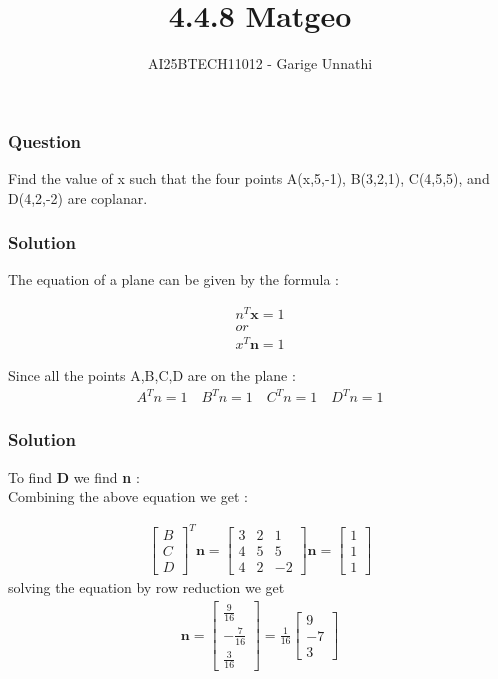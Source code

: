 \documentclass{beamer}
\title{4.4.8 Matgeo}
\author{AI25BTECH11012 - Garige Unnathi}
\date{}
\begin{document}
\frame{\titlepage}

\begin{frame}
\frametitle{Question}
Find the value of x such that the four points A(x,5,-1), B(3,2,1), C(4,5,5), and
D(4,2,-2) are coplanar.\\
\end{frame}


\begin{frame}
\frametitle{Solution}
The equation of a plane can be given by the formula :
         
\begin{align}
    n^{T}\textbf{x} = 1\\
    or\\
    x^{T}\textbf{n} =1 
\end{align}

Since all the points A,B,C,D are on the plane :
\begin{align}
   A^{T}n =1 \quad  B^{T}n =1 \quad  C^{T}n =1 \quad  D^{T}n =1 
\end{align}


\end{frame}



\begin{frame}
\frametitle{Solution}
To find \textbf{D} we find \textbf{n} :\\
Combining the above equation we get :


\begin{align}
   \begin{bmatrix}B \\ C \\ D\end{bmatrix}^{T}\textbf{n}  = \begin{bmatrix}3 & 2 & 1\\
                                     4 & 5  &  5 \\
                                     4 & 2 &-2\end{bmatrix}\textbf{n}  = \begin{bmatrix}1\\1\\1\end{bmatrix}
\end{align}
solving the equation by row reduction we get 
\begin{align}
     \textbf{n} =  \begin{bmatrix}\frac{9}{16} \\ -\frac{7}{16} \\ \frac{3}{16}\end{bmatrix} = \frac{1}{16} \begin{bmatrix}9 \\ -7 \\ 3\end{bmatrix}
\end{align}
\end{frame}
\end{document}
